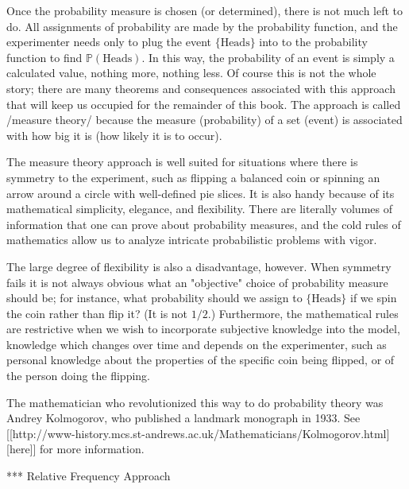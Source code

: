Once the probability measure is chosen (or determined), there is not
much left to do. All assignments of probability are made by the
probability function, and the experimenter needs only to plug the
event \(\{ \mbox{Heads} \}\) into to the probability function to find
\(\mathbb{P}(\mbox{Heads})\). In this way, the probability of an event
is simply a calculated value, nothing more, nothing less. Of course
this is not the whole story; there are many theorems and consequences
associated with this approach that will keep us occupied for the
remainder of this book. The approach is called /measure theory/
because the measure (probability) of a set (event) is associated with
how big it is (how likely it is to occur).

The measure theory approach is well suited for situations where there
is symmetry to the experiment, such as flipping a balanced coin or
spinning an arrow around a circle with well-defined pie slices. It is
also handy because of its mathematical simplicity, elegance, and
flexibility. There are literally volumes of information that one can
prove about probability measures, and the cold rules of mathematics
allow us to analyze intricate probabilistic problems with vigor.

The large degree of flexibility is also a disadvantage, however. When
symmetry fails it is not always obvious what an "objective" choice
of probability measure should be; for instance, what probability
should we assign to \( \{ \mbox{Heads} \} \) if we spin the coin
rather than flip it? (It is not \(1/2\).) Furthermore, the
mathematical rules are restrictive when we wish to incorporate
subjective knowledge into the model, knowledge which changes over time
and depends on the experimenter, such as personal knowledge about the
properties of the specific coin being flipped, or of the person doing
the flipping.

The mathematician who revolutionized this way to do probability theory
was Andrey Kolmogorov, who published a landmark monograph in 1933. See
[[http://www-history.mcs.st-andrews.ac.uk/Mathematicians/Kolmogorov.html][here]] for more information.

*** Relative Frequency Approach

